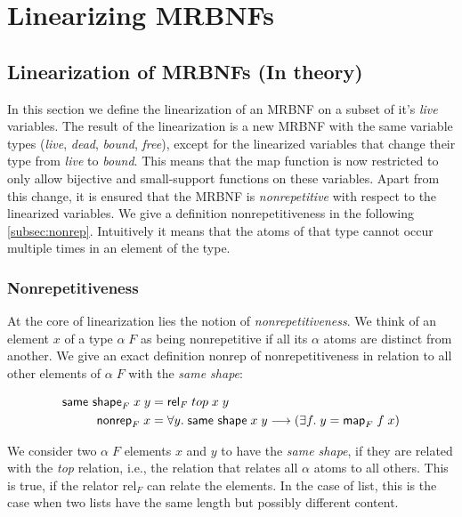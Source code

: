 
\chapter{Linearizing MRBNFs}
\label{chapter:methodology}

  \section{Linearization of MRBNFs (In theory)}

  In this section we define the linearization of an MRBNF on a subset of it's \textit{live} variables. The result of the linearization is a new MRBNF with the same variable types (\textit{live}, \textit{dead}, \textit{bound}, \textit{free}), except for the linearized variables that change their type from \textit{live} to \textit{bound}. This means that the map function is now restricted to only allow bijective and small-support functions on these variables. Apart from this change, it is ensured that the MRBNF is \textit{nonrepetitive} with respect to the linearized variables. We give a definition nonrepetitiveness in the following \autoref{subsec:nonrep}. Intuitively it means that the atoms of that type cannot occur multiple times in an element of the type.

    \subsection{Nonrepetitiveness}
    \label{subsec:nonrep}
    At the core of linearization lies the notion of \textit{nonrepetitiveness}. We think of an element $x$ of a type $\alpha\; F$ as being nonrepetitive if all its $\alpha$ atoms are distinct from another. We give an exact definition \textsf{nonrep} of nonrepetitiveness in relation to all other elements of $\alpha\; F$ with the \textit{same shape}:

    \begin{align}
      \text{\textsf{same shape}}_F\; x\; y &= \text{\textsf{rel}}_F\; top\; x\; y\\
      \text{\textsf{nonrep}}_F\; x &= \forall y.\; \text{\textsf{same shape}}\; x\; y \longrightarrow (\exists f.\; y = \text{\textsf{map}}_F\; f\; x)
    \end{align}

    We consider two $\alpha\; F$ elements $x$ and $y$ to have the \textit{same shape}, if they are related with the \textit{top} relation, i.e., the relation that relates all $\alpha$ atoms to all others. This is true, if the relator \textsf{rel}$_F$ can relate the elements. In the case of \textsf{list}, this is the case when two lists have the same length but possibly different content. 

